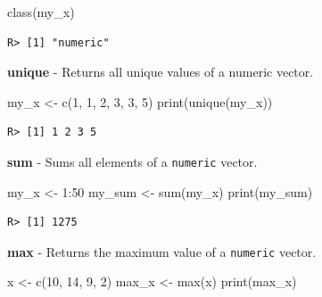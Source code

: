\documentclass[
  12pt,
]{book}
\newenvironment{Shaded}{\begin{snugshade}}{\end{snugshade}}
\newcommand{\DecValTok}[1]{\textcolor[rgb]{0.06,0.06,0.06}{#1}}
\newcommand{\FunctionTok}[1]{\textcolor[rgb]{0,0,0}{#1}}
\newcommand{\NormalTok}[1]{#1}
\newcommand{\OtherTok}[1]{\textcolor[rgb]{0.37,0.37,0.37}{#1}}
\newcommand{\SpecialCharTok}[1]{\textcolor[rgb]{0,0,0}{#1}}
\begin{document}
\begin{Shaded}
\begin{Highlighting}[]
\FunctionTok{class}\NormalTok{(my\_x)}
\end{Highlighting}
\end{Shaded}

\begin{verbatim}
R> [1] "numeric"
\end{verbatim}

\textbf{unique} - Returns all unique values of a numeric vector. 

\begin{Shaded}
\begin{Highlighting}[]
\NormalTok{my\_x }\OtherTok{\textless{}{-}} \FunctionTok{c}\NormalTok{(}\DecValTok{1}\NormalTok{, }\DecValTok{1}\NormalTok{, }\DecValTok{2}\NormalTok{, }\DecValTok{3}\NormalTok{, }\DecValTok{3}\NormalTok{, }\DecValTok{5}\NormalTok{)}
\FunctionTok{print}\NormalTok{(}\FunctionTok{unique}\NormalTok{(my\_x))}
\end{Highlighting}
\end{Shaded}

\begin{verbatim}
R> [1] 1 2 3 5
\end{verbatim}

\textbf{sum} - Sums all elements of a \texttt{numeric} vector. 

\begin{Shaded}
\begin{Highlighting}[]
\NormalTok{my\_x }\OtherTok{\textless{}{-}} \DecValTok{1}\SpecialCharTok{:}\DecValTok{50}
\NormalTok{my\_sum }\OtherTok{\textless{}{-}} \FunctionTok{sum}\NormalTok{(my\_x)}
\FunctionTok{print}\NormalTok{(my\_sum)}
\end{Highlighting}
\end{Shaded}

\begin{verbatim}
R> [1] 1275
\end{verbatim}

\textbf{max} - Returns the maximum value of a \texttt{numeric} vector. 

\begin{Shaded}
\begin{Highlighting}[]
\NormalTok{x }\OtherTok{\textless{}{-}} \FunctionTok{c}\NormalTok{(}\DecValTok{10}\NormalTok{, }\DecValTok{14}\NormalTok{, }\DecValTok{9}\NormalTok{, }\DecValTok{2}\NormalTok{)}
\NormalTok{max\_x }\OtherTok{\textless{}{-}} \FunctionTok{max}\NormalTok{(x)}
\FunctionTok{print}\NormalTok{(max\_x)}
\end{Highlighting}
\end{Shaded}
\end{document}
